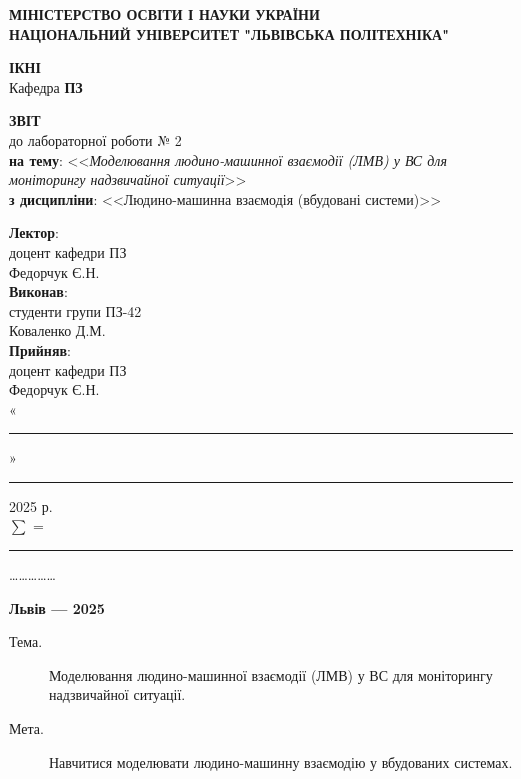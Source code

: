 \documentclass[14pt]{extreport}
\newcommand\subject{Людино-машинна взаємодія (вбудовані системи)}
\newcommand\lecturer{доцент кафедри ПЗ\\Федорчук Є.Н.}
\newcommand\teacher{доцент кафедри ПЗ\\Федорчук Є.Н.}
\newcommand\mygroup{ПЗ-42}
\newcommand\lab{2}
\newcommand\theme{Моделювання людино-машинної взаємодії (ЛМВ) у ВС
для моніторингу надзвичайної ситуації}
\newcommand\purpose{Навчитися моделювати людино-машинну взаємодію у
вбудованих системах}
\begin{document}
\begin{normalsize}
	\begin{titlepage}
		\thispagestyle{empty}
		\begin{center}
			\textbf{МІНІСТЕРСТВО ОСВІТИ І НАУКИ УКРАЇНИ\\
				НАЦІОНАЛЬНИЙ УНІВЕРСИТЕТ "ЛЬВІВСЬКА ПОЛІТЕХНІКА"}
		\end{center}
		\begin{flushright}
			\textbf{ІКНІ}\\
			Кафедра \textbf{ПЗ}
		\end{flushright}
		\vspace{20pt}
		\begin{center}
			\textbf{ЗВІТ}\\
			\vspace{10pt}
			до лабораторної роботи № \lab\\
			\textbf{на тему}: <<\textit{\theme}>>\\
			\textbf{з дисципліни}: <<\subject>>
		\end{center}
		\vspace{20pt}
		\begin{flushright}
			
			\textbf{Лектор}:\\
			\lecturer\\
			\vspace{28pt}
			\textbf{Виконав}:\\
			
			студенти групи \mygroup\\
			Коваленко Д.М.\\
			\vspace{28pt}
			\textbf{Прийняв}:\\
			
			\teacher\\
			
			\vspace{28pt}
			«\rule{1cm}{0.15mm}» \rule{1.5cm}{0.15mm} 2025 р.\\
			$\sum$ = \rule{1cm}{0.15mm}……………\\
			
		\end{flushright}
		\vspace{\fill}
		\begin{center}
			\textbf{Львів — 2025}
		\end{center}
	\end{titlepage}
		
	\begin{description}
		\item[Тема.] \theme.
		\item[Мета.] \purpose.
	\end{description}


\end{normalsize}
\end{document}
